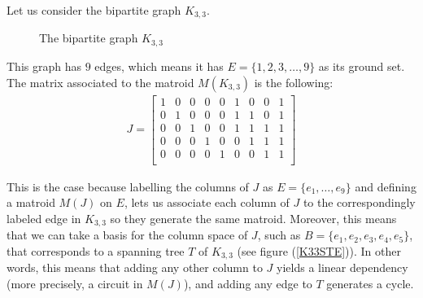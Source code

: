 \begin{exmp}
    Let us consider the bipartite graph $K_{3,3}$.
\begin{figure}[H]
\centering
{}
    \caption{The bipartite graph $K_{3,3}$}
    \label{fig:enter-label}
\end{figure}

This graph has $9$ edges, which means it has $E=\{1,2,3, \dots, 9\} $ as its ground set. The matrix associated to the matroid $M(K_{3,3})$ is the following:
\begin{align*}
J = \begin{bmatrix}
    1 & 0 & 0 & 0 & 0 & 1 & 0 & 0 & 1\\
    0 & 1 & 0 & 0 & 0 & 1 & 1 & 0 & 1\\
    0 & 0 & 1 & 0 & 0 & 1 & 1 & 1 & 1\\
    0 & 0 & 0 & 1 & 0 & 0 & 1 & 1 & 1\\
    0 & 0 & 0 & 0 & 1 & 0 & 0 & 1 & 1\\
\end{bmatrix}
\end{align*}

    This is the case because labelling the columns of $J$ as $E = \{e_1,\dots, e_9\}$ and defining a matroid $M(J)$ on $E$, lets us associate each column of $J$ to the correspondingly labeled edge in $K_{3,3}$ so they generate the same matroid. Moreover, this means that we can take a basis for the column space of $J$, such as $B = \{e_1, e_2, e_3, e_4, e_5\}$, that corresponds to a spanning tree $T$ of $K_{3,3}$ (see figure (\ref{K33STE})). In other words, this means that adding any other column to $J$ yields a linear dependency (more precisely, a circuit in $M(J)$), and adding any edge to $T$ generates a cycle.


\end{exmp}
